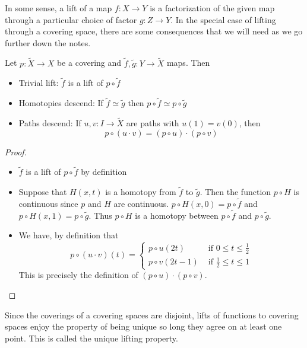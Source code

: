 \documentclass[a4paper]{article}
\begin{document}
In some sense, a lift of a map $f:X\to Y$ is a factorization of the given map through a particular choice of factor $g:Z\to Y$. In the special case of lifting through a covering space, there are some consequences that we will need as we go further down the notes. 

\begin{prp}{}{} Let $p:\widetilde{X}\to X$ be a covering and $\widetilde{f},\widetilde{g}:Y\to\widetilde{X}$ maps. Then 
\begin{itemize}
\item Trivial lift: $\widetilde{f}$ is a lift of $p\circ\widetilde{f}$
\item Homotopies descend: If $\widetilde{f}\simeq\widetilde{g}$ then $p\circ\widetilde{f}\simeq p\circ\widetilde{g}$
\item Paths descend: If $u,v:I\to\widetilde{X}$ are paths with $u(1)=v(0)$, then $$p\circ(u\cdot v)=(p\circ u)\cdot(p\circ v)$$
\end{itemize} 
\begin{proof}~\\
\begin{itemize}
\item $\widetilde{f}$ is a lift of $p\circ\widetilde{f}$ by definition
\item Suppose that $H(x,t)$ is a homotopy from $\widetilde{f}$ to $\widetilde{g}$. Then the function $p\circ H$ is continuous since $p$ and $H$ are continuous. $p\circ H(x,0)=p\circ\widetilde{f}$ and $p\circ H(x,1)=p\circ\widetilde{g}$. Thus $p\circ H$ is a homotopy between $p\circ\widetilde{f}$ and $p\circ\widetilde{g}$. 
\item We have, by definition that $$p\circ(u\cdot v)(t)=\begin{cases}
p\circ u(2t) & \text{ if }0\leq t\leq\frac{1}{2}\\
p\circ v(2t-1) & \text{ if }\frac{1}{2}\leq t\leq 1
\end{cases}$$
This is precisely the definition of $(p\circ u)\cdot(p\circ v)$. 
\end{itemize}
\end{proof}
\end{prp}

Since the coverings of a covering spaces are disjoint, lifts of functions to covering spaces enjoy the property of being unique so long they agree on at least one point. This is called the unique lifting property. 
\end{document}
